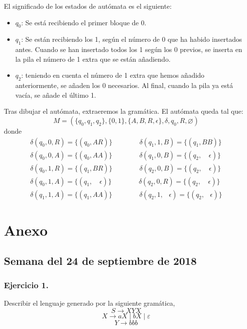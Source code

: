 \documentclass[11pt,a4paper]{article}
\begin{document}
El significado de los estados de autómata es el siguiente:
\begin{itemize}
	\item $q_0$: Se está recibiendo el primer bloque de 0.
	\item $q_1$: Se están recibiendo los 1, según el número de 0 que ha habido insertados antes. Cuando se han insertado todos los 1 según los 0 previos, se inserta en la pila el número de 1 extra que se están añadiendo.
	\item $q_2$: teniendo en cuenta el número de 1 extra que hemos añadido anteriormente, se añaden los 0 necesarios. Al final, cuando la pila ya está vacía, se añade el último 1.
\end{itemize}

Tras dibujar el autómata, extraeremos la gramática. El autómata queda tal que:
\[M=(\{q_0,q_1,q_2\},\{0,1\},\{A,B,R,\epsilon\},\delta,q_0,R,\varnothing)\]
donde
	\[\begin{array}{c}
		\delta(q_0,0,R)=\{(q_0,AR)\} \qquad \qquad \delta(q_1,1,B)=\{(q_1,BB)\}\\
		\delta(q_0,0,A)=\{(q_0,AA)\} \qquad \qquad \delta(q_1,0,B)=\{(q_2, \quad \epsilon)\}\\
		\delta(q_0,1,R)=\{(q_1,BR)\} \qquad \qquad \delta(q_2,0,B)=\{(q_2, \quad \epsilon)\}\\
		\delta(q_0,1,A)=\{(q_1, \quad \epsilon)\} \qquad \qquad \delta(q_2,0,R)=\{(q_2, \quad \epsilon)\}\\
		\delta(q_1,1,A)=\{(q_1,AA)\} \qquad \qquad \delta(q_2,1,\; \; \: \epsilon)=\{(q_2,\; \; \:\epsilon)\}
	\end{array}\]

\newpage

\section{Anexo}
\subsection{Semana del 24 de septiembre de 2018}

\subsubsection{Ejercicio 1.} Describir el lenguaje generado por la siguiente gramática,\\
	\[S\rightarrow XYX \]
	\[X\rightarrow aX \mid bX \mid \varepsilon\]
	\[Y\rightarrow bbb\]
	
\end{document}

